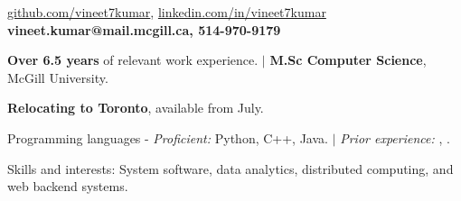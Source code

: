 \documentclass{resume} %
\begin{document}
\begin{hSubsection}
{
    \href{https://github.com/vineet7kumar}{github.com/vineet7kumar},
    \href{https://linkedin.com/in/vineet7kumar}{linkedin.com/in/vineet7kumar}
}
{
    \textbf{vineet.kumar@mail.mcgill.ca, 514-970-9179}
}
{%
}
\end{hSubsection}



\smallskip \smallskip 
\begin{rSection}{} \smallskip 
\begin{lSubsection} 
\item \textbf{Over 6.5 years} of relevant work experience.
        $\vert$ \textbf{M.Sc Computer Science}, McGill University. 
\item \textbf{Relocating to Toronto}, available from July.
\item Programming languages - \emph{Proficient:} Python, C++, Java.
        $\vert$ \emph{Prior experience:} \xtenx, \matlabx.
\item Skills and interests: System software, data analytics, distributed
        computing, and web backend systems.
\end{lSubsection}
\end{rSection}
\end{document}
